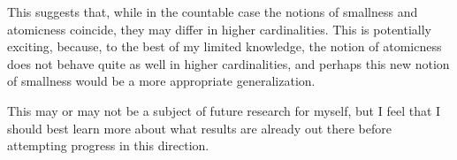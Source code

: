 \documentclass{article}
\theoremstyle{nonumberplain}
\begin{document}
This suggests that, while in the countable case the notions of smallness and atomicness coincide, they may differ in higher cardinalities. This is potentially exciting, because, to the best of my limited knowledge, the notion of atomicness does not behave quite as well in higher cardinalities, and perhaps this new notion of smallness would be a more appropriate generalization.

This may or may not be a subject of future research for myself, but I feel that I should best learn more about what results are already out there before attempting progress in this direction.

%
%
\end{document}
